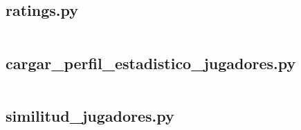 \subsection{ratings.py}
\begin{lstlisting}[language=Python]
% Pegar aqui el script completo: ratings.py
\end{lstlisting}

\subsection{cargar\_perfil\_estadistico\_jugadores.py}
\begin{lstlisting}[language=Python]
% Pegar aqui el script completo: cargar_perfil_estadistico_jugadores.py
\end{lstlisting}

\subsection{similitud\_jugadores.py}
\begin{lstlisting}[language=Python]
% Pegar aqui el script completo: similitud_jugadores.py
\end{lstlisting}
